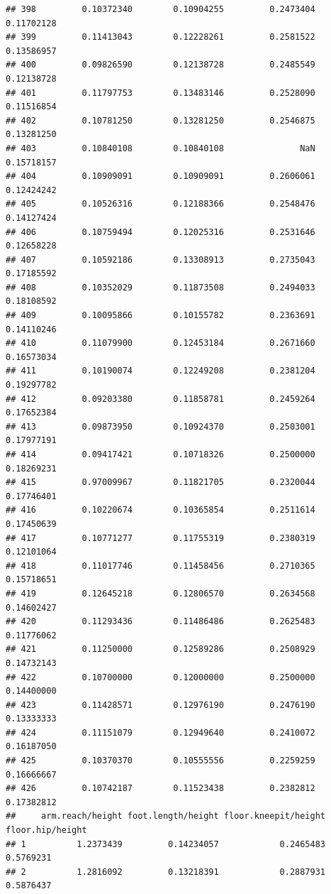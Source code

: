 \documentclass[]{article}
\begin{document}
\begin{verbatim}
## 398         0.10372340        0.10904255         0.2473404          0.11702128
## 399         0.11413043        0.12228261         0.2581522          0.13586957
## 400         0.09826590        0.12138728         0.2485549          0.12138728
## 401         0.11797753        0.13483146         0.2528090          0.11516854
## 402         0.10781250        0.13281250         0.2546875          0.13281250
## 403         0.10840108        0.10840108               NaN          0.15718157
## 404         0.10909091        0.10909091         0.2606061          0.12424242
## 405         0.10526316        0.12188366         0.2548476          0.14127424
## 406         0.10759494        0.12025316         0.2531646          0.12658228
## 407         0.10592186        0.13308913         0.2735043          0.17185592
## 408         0.10352029        0.11873508         0.2494033          0.18108592
## 409         0.10095866        0.10155782         0.2363691          0.14110246
## 410         0.11079900        0.12453184         0.2671660          0.16573034
## 411         0.10190074        0.12249208         0.2381204          0.19297782
## 412         0.09203380        0.11858781         0.2459264          0.17652384
## 413         0.09873950        0.10924370         0.2503001          0.17977191
## 414         0.09417421        0.10718326         0.2500000          0.18269231
## 415         0.97009967        0.11821705         0.2320044          0.17746401
## 416         0.10220674        0.10365854         0.2511614          0.17450639
## 417         0.10771277        0.11755319         0.2380319          0.12101064
## 418         0.11017746        0.11458456         0.2710365          0.15718651
## 419         0.12645218        0.12806570         0.2634568          0.14602427
## 420         0.11293436        0.11486486         0.2625483          0.11776062
## 421         0.11250000        0.12589286         0.2508929          0.14732143
## 422         0.10700000        0.12000000         0.2500000          0.14400000
## 423         0.11428571        0.12976190         0.2476190          0.13333333
## 424         0.11151079        0.12949640         0.2410072          0.16187050
## 425         0.10370370        0.10555556         0.2259259          0.16666667
## 426         0.10742187        0.11523438         0.2382812          0.17382812
##     arm.reach/height foot.length/height floor.kneepit/height floor.hip/height
## 1          1.2373439         0.14234057            0.2465483        0.5769231
## 2          1.2816092         0.13218391            0.2887931        0.5876437

\end{verbatim}
\end{document}
